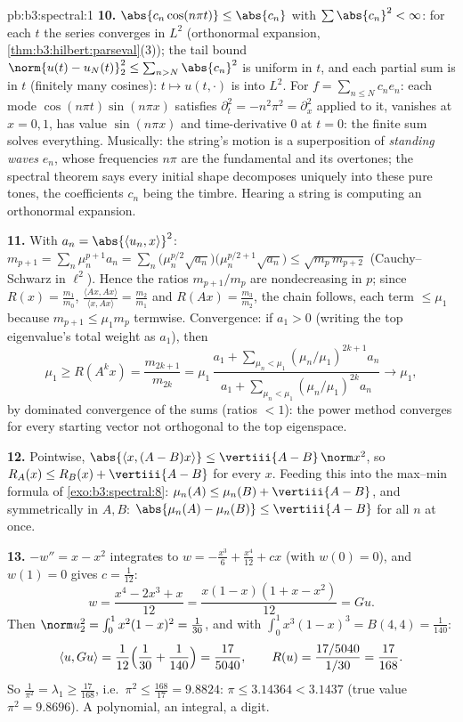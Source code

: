 \begin{solution}{pb:b3:spectral:1}
\textbf{10.} $\abs{c_n\cos(n\pi t)} \leq \abs{c_n}$ with
$\sum\abs{c_n}^2 < \infty$: for each $t$ the series converges
in $L^2$ (orthonormal expansion,
\cref{thm:b3:hilbert:parseval}(3)); the tail bound
$\norm{u(t) - u_N(t)}_2^2 \leq \sum_{n>N}\abs{c_n}^2$ is
uniform in $t$, and each partial sum is  in $t$
(finitely many cosines): $t \mapsto u(t,\cdot)$ is 
into $L^2$. For $f = \sum_{n\leq N}c_ne_n$: each mode
$\cos(n\pi t)\sin(n\pi x)$ satisfies $\partial_t^2 =
-n^2\pi^2 = \partial_x^2$ applied to it, vanishes at $x = 0,
1$, has value $\sin(n\pi x)$ and time-derivative $0$ at $t =
0$: the finite sum solves everything. Musically: the string's
motion is a superposition of \emph{standing waves} $e_n$,
whose frequencies $n\pi$ are the fundamental and its
overtones; the spectral theorem says every initial shape
decomposes uniquely into these pure tones, the coefficients
$c_n$ being the timbre. Hearing a string is computing an
orthonormal expansion.

\textbf{11.} With $a_n = \abs{\langle u_n, x\rangle}^2$:
$m_{p+1} = \sum_n\mu_n^{p+1}a_n = \sum_n\bigl(\mu_n^{p/2}
\sqrt{a_n}\bigr)\bigl(\mu_n^{p/2+1}\sqrt{a_n}\bigr) \leq
\sqrt{m_p\,m_{p+2}}$ (Cauchy--Schwarz in $\ell^2$). Hence
the ratios $m_{p+1}/m_p$ are nondecreasing in $p$; since
$R(x) = \frac{m_1}{m_0}$, $\frac{\langle Ax, Ax\rangle}
{\langle x, Ax\rangle} = \frac{m_2}{m_1}$ and $R(Ax) =
\frac{m_3}{m_2}$, the chain follows, each term $\leq \mu_1$
because $m_{p+1} \leq \mu_1m_p$ termwise. Convergence: if
$a_1 > 0$ (writing the top eigenvalue's total weight as
$a_1$), then
\[
\mu_1 \geq R(A^kx) = \frac{m_{2k+1}}{m_{2k}} =
\mu_1\,\frac{a_1 + \sum_{\mu_n<\mu_1}(\mu_n/\mu_1)^{2k+1}
a_n}{a_1 + \sum_{\mu_n<\mu_1}(\mu_n/\mu_1)^{2k}a_n}
\longrightarrow \mu_1,
\]
by dominated convergence of the sums (ratios $< 1$): the
power method converges for every starting vector not
orthogonal to the top eigenspace.

\textbf{12.} Pointwise, $\abs{\langle x, (A - B)x\rangle}
\leq \vertiii{A - B}\,\norm x^2$, so $R_A(x) \leq R_B(x) +
\vertiii{A - B}$ for every $x$. Feeding this into the
max--min formula of \cref{exo:b3:spectral:8}: $\mu_n(A)
\leq \mu_n(B) + \vertiii{A - B}$, and symmetrically in $A,
B$: $\abs{\mu_n(A) - \mu_n(B)} \leq \vertiii{A - B}$ for
all $n$ at once.

\textbf{13.} $-w'' = x - x^2$ integrates to $w = -\frac{x^3}6
+ \frac{x^4}{12} + cx$ (with $w(0) = 0$), and $w(1) = 0$
gives $c = \frac1{12}$:
\[
w = \frac{x^4 - 2x^3 + x}{12} = \frac{x(1-x)(1 + x -
x^2)}{12} = Gu .
\]
Then $\norm u_2^2 = \int_0^1x^2(1-x)^2 = \frac1{30}$, and
with $\int_0^1x^3(1-x)^3 = B(4,4) = \frac1{140}$:
\[
\langle u, Gu\rangle = \frac1{12}\Bigl(\frac1{30} +
\frac1{140}\Bigr) = \frac{17}{5040},
\qquad
R(u) = \frac{17/5040}{1/30} = \frac{17}{168} .
\]
So $\frac1{\pi^2} = \lambda_1 \geq \frac{17}{168}$, i.e.\
$\pi^2 \leq \frac{168}{17} = 9.8824$: $\pi \leq 3.14364 <
3.1437$ (true value $\pi^2 = 9.8696$). A polynomial, an
integral, a digit.


\end{solution}
